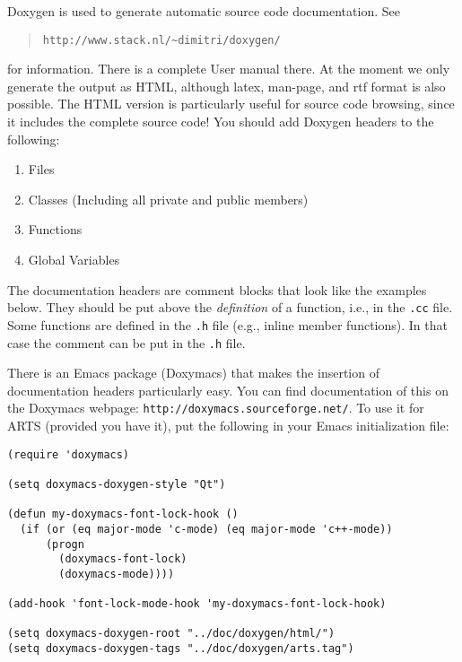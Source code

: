 Doxygen is used to generate automatic source code documentation. See
\begin{quote}
  \verb|http://www.stack.nl/~dimitri/doxygen/|
\end{quote}
for information. There is a complete User manual there. At the moment
we only generate the output as HTML, although latex, man-page, and rtf
format is also possible. The HTML version is particularly useful for
source code browsing, since it includes the complete source code! You
should add Doxygen headers to the following:

\begin{enumerate}
\item Files
\item Classes (Including all private and public members)
\item Functions
\item Global Variables
\end{enumerate}

The documentation headers are comment blocks that look like the
examples below. They should be put above the \emph{definition} of a
function, i.e., in the \verb|.cc| file.  Some functions are defined in
the \verb|.h| file (e.g., inline member functions). In that case the
comment can be put in the \verb|.h| file.

There is an Emacs package (Doxymacs) that makes the insertion of
documentation headers particularly easy. You can find documentation of
this on the Doxymacs webpage: \verb|http://doxymacs.sourceforge.net/|.
To use it for ARTS (provided you have it), put the following in your
Emacs initialization file:

\begin{verbatim}
(require 'doxymacs)

(setq doxymacs-doxygen-style "Qt")

(defun my-doxymacs-font-lock-hook ()
  (if (or (eq major-mode 'c-mode) (eq major-mode 'c++-mode))
      (progn
        (doxymacs-font-lock)
        (doxymacs-mode))))

(add-hook 'font-lock-mode-hook 'my-doxymacs-font-lock-hook)

(setq doxymacs-doxygen-root "../doc/doxygen/html/")
(setq doxymacs-doxygen-tags "../doc/doxygen/arts.tag")
\end{verbatim}

